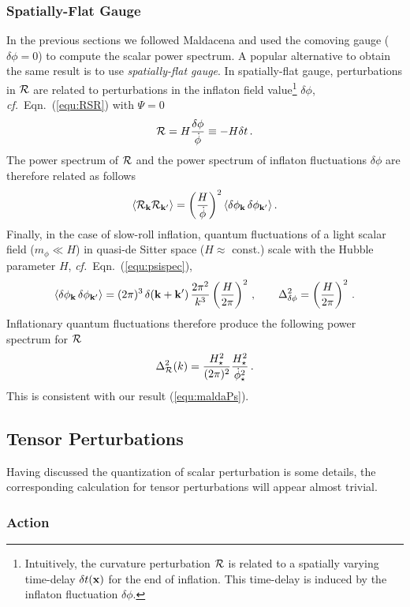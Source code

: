 \documentclass[12pt,letterpaper,rotate]{article}
\def\beq{\begin{equation}}
\def\eeq{\end{equation}}
\def\R{{\cal R}}
\begin{document}
{\subsubsection{Spatially-Flat Gauge}

In the previous sections we followed Maldacena and used the comoving gauge ($\delta \phi=0$) to compute the scalar power spectrum.
A popular alternative to obtain the same result is to use {\it spatially-flat gauge}.
In spatially-flat gauge, perturbations in $\R$ are related to perturbations in the inflaton field
value\footnote{Intuitively, the curvature perturbation $\R$ is related to a spatially varying time-delay
$\delta t({\bf x})$ for the end of inflation. This time-delay is induced by the inflaton
fluctuation $\delta \phi$.} $\delta \phi$, {\it cf.}~Eqn.~(\ref{equ:RSR}) with $\Psi =0$ \beq \R =  H \frac{\delta \phi}{\dot \phi} \equiv - H \delta t\, . \eeq 
The power spectrum of $\R$ and the power spectrum of inflaton
fluctuations $\delta \phi$ are therefore related as follows
\beq \label{equ:zetapower} \langle \R_{\bf k}
\R_{\bf k'} \rangle =\left( \frac{H}{\dot \phi} \right)^2 \langle \delta \phi_{\bf k} \, \delta \phi_{\bf k'}
\rangle\, . \eeq
Finally, in the case of slow-roll inflation, quantum fluctuations of a light scalar field ($m
_\phi \ll H$) in quasi-de Sitter space ($H\approx $ const.) scale with the Hubble parameter $H$, {\it cf.}~Eqn.~(\ref{equ:psispec}), 
\beq \langle
\delta \phi_{\bf k} \, \delta \phi_{\bf k'} \rangle = (2 \pi)^3 \, \delta({\bf k}+{\bf k'})\, \frac{2\pi^2}{k^{3}} \left(
\frac{H}{2\pi}\right)^2\, , \qquad \Delta_{\delta \phi}^2 =  \left( \frac{H}{2\pi} \right)^2\, .
\eeq 
Inflationary quantum fluctuations therefore
produce the following power spectrum for $\R$ 
\beq
\Delta_\R^2(k) = \frac{H_\star^2}{(2\pi)^2} \frac{H^2_\star}{\dot \phi^2_\star}\, .
\eeq
This is consistent with our result (\ref{equ:maldaPs}).

\subsection{Tensor Perturbations}

Having discussed the quantization of scalar perturbation is some details, the corresponding calculation for tensor perturbations will appear almost trivial.

\subsubsection{Action}

}
\end{document}
